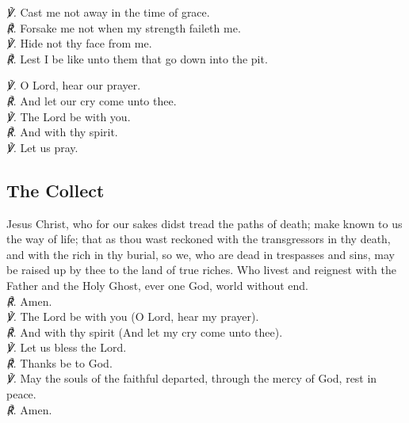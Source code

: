 \textit{\scshape ℣.} Cast me not away in the time of grace.\\
\textit{\scshape ℟.} Forsake me not when my strength faileth me.\\
\textit{\scshape ℣.} Hide not thy face from me.\\
\textit{\scshape ℟.} Lest I be like unto them that go down into the pit.\\
\par
\textit{\scshape ℣.} O Lord, hear our prayer.\\
\textit{\scshape ℟.} And let our cry come unto thee.\\
\textit{\scshape ℣.} The Lord be with you.\\
\textit{\scshape ℟.} And with thy spirit.\\
\textit{\scshape ℣.} Let us pray.
\subsection{The Collect}
 Jesus Christ, who for our sakes didst tread the paths of death; make known to us the way of life; that as thou wast reckoned with the transgressors in thy death, and with the rich in thy burial, so we, who are dead in trespasses and sins, may be raised up by thee to the land of true riches. Who livest and reignest with the Father and the Holy Ghost, ever one God, world without end.\\
\textit{\scshape ℟.} Amen.\\
\textit{\scshape ℣.} The Lord be with you (O Lord, hear my prayer).\\
\textit{\scshape ℟.} And with thy spirit (And let my cry come unto thee).\\
\textit{\scshape ℣.} Let us bless the Lord.\\
\textit{\scshape ℟.} Thanks be to God.\\
\textit{\scshape ℣.} May the souls {} of the faithful departed, through the mercy of God, rest in peace.\\
\textit{\scshape ℟.} Amen.